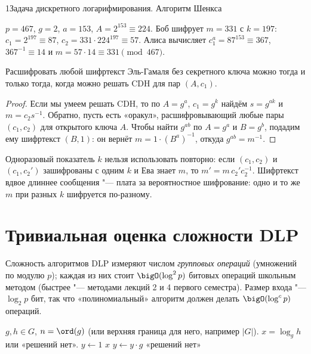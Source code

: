 \begin{lecture}{1}{Задача дискретного логарифмирования. Алгоритм Шенкса}
\begin{example}
$p = 467$, $g = 2$, $a = 153$, $A = 2^{153} \equiv 224$. Боб шифрует $m = 331$ с $k = 197$:
$c_1 = 2^{197} \equiv 87$, $c_2 = 331 \cdot 224^{197} \equiv 57$. Алиса вычисляет $c_1^a =
87^{153} \equiv 367$, $367^{-1} \equiv 14$ и $m = 57 \cdot 14 \equiv 331 \pmod{467}$.
\end{example}


\begin{proposition}
Расшифровать любой шифртекст Эль-Гамаля без секретного ключа можно тогда и только тогда, когда
можно решать CDH для пар $(A, c_1)$.
\end{proposition}

\begin{proof}
Если мы умеем решать CDH, то по $A = g^a$, $c_1 = g^k$ найдём $s = g^{ak}$ и $m = c_2 s^{-1}$.
Обратно, пусть есть «оракул», расшифровывающий любые пары $(c_1, c_2)$ для открытого ключа $A$.
Чтобы найти $g^{ab}$ по $A = g^a$ и $B = g^b$, подадим ему шифртекст $(B, 1)$: он вернёт
$m = 1 \cdot (B^a)^{-1}$, откуда $g^{ab} = m^{-1}$.
\end{proof}

\begin{remark}
Одноразовый показатель $k$ нельзя использовать повторно: если $(c_1, c_2)$ и $(c_1, c_2')$
зашифрованы с одним $k$ и Ева знает $m$, то $m' = m\, c_2' c_2^{-1}$. Шифртекст вдвое длиннее
сообщения "--- плата за вероятностное шифрование: одно и то же $m$ при разных $k$ шифруется
по-разному.
\end{remark}


\section{Тривиальная оценка сложности DLP}

Сложность алгоритмов DLP измеряют числом \emph{групповых операций} (умножений по модулю $p$);
каждая из них стоит $\bigO(\log^2 p)$ битовых операций школьным методом (быстрее "--- методами
лекций 2 и 4 первого семестра). Размер входа "--- $\log_2 p$ бит, так что «полиномиальный»
алгоритм должен делать $\bigO(\log^c p)$ операций.

\begin{algorithm}[перебор]\label{l1:brute}
\begin{algorithmic}[1]
\Require $g, h \in G$, $n = \ord(g)$ (или верхняя граница для него, например $|G|$).
\Ensure $x = \log_g h$ или «решений нет».
\State $y \gets 1$
   \Return $x$ \EndIf
  \State $y \gets y \cdot g$
\EndFor
\State \Return «решений нет»
\end{algorithmic}
\end{algorithm}


\end{lecture}
